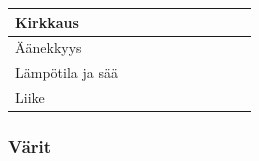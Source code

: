 \documentclass[finnish, 12pt, a4paper, elec, utf8, a-1b, online]{aaltothesis}
\begin{document}
{\begin{longtable}{p{2.5cm}|p{6cm}|p{0.5cm}p{0.5cm}p{0.5cm}|p{0.5cm}|p{0.5cm}p{0.5cm}p{0.5cm}|p{0.5cm}|}
        \midrule
        Kirkkaus                                                                                                                                                                                                                                                                                                                                                                                                                    \\
        \midrule
        Äänekkyys                                                                                                                                                                                                                                                                                                                                                                                                                   \\
        \midrule
        Lämpötila ja sää                                                                                                                                                                                                                                                                                                                                                                                                            \\
        \midrule
        Liike                                                                                                                                                                                                                                                                                                                                                                                                                       \\
    \end{longtable}
}

\subsubsection{Värit}
\end{document}
